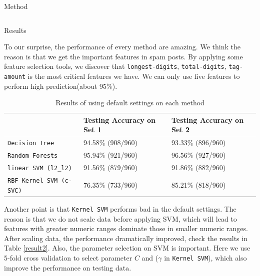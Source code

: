 \documentclass[final,hyperref={pdfpagelabels=false}]{beamer}
\begin{document}
\begin{frame}[t]
\begin{columns}[t]
\begin{column}{.465\textwidth}
\begin{block}{Method}
\begin{columns}
\begin{column}{.4\textwidth}
\end{column}

\end{columns}

     
\end{block}


\begin{block}{Results}

To our surprise, the performance of every method are amazing. We think the reason is that we get the important features in spam posts. By applying some feature selection tools\cite{YW04a}, we discover that \texttt{longest-digits}, \texttt{total-digits}, \texttt{tag-amount} is the most critical features we have. We can only use five features to perform high prediction(about 95\%). 

\begin{table}[h]
\centering
\caption{Results of using default settings on each method}
\label{result1}
\begin{tabular}{l|l|l}
                    & Testing Accuracy on Set 1     & Testing Accuracy on Set 2     \\ \hline
\texttt{Decision Tree}       & 94.58\% (908/960) & 93.33\% (896/960) \\ \hline
\texttt{Random Forests}      & 95.94\% (921/960) & 96.56\% (927/960) \\ \hline
\texttt{linear SVM (l2\_l2)} & 91.56\% (879/960) & 91.86\% (882/960) \\ \hline
\texttt{RBF Kernel SVM (c-SVC)}      & 76.35\% (733/960) & 85.21\% (818/960)        
\end{tabular}
\end{table}

Another point is that \texttt{Kernel SVM} performs bad in the default settings. The reason is that we do not scale data before applying SVM, which will lead to features with greater numeric ranges dominate those in smaller numeric ranges. After scaling data, the performance dramatically improved, check the results in Table \ref{result2}. Also, the parameter selection on SVM is important. Here we use 5-fold cross validation to select parameter $C$ \cite{BYC15a} and ($\gamma$ in \texttt{Kernel SVM}), which also improve the performance on testing data.



\end{block}
\end{column}
\end{columns}
\end{frame}
\end{document}
